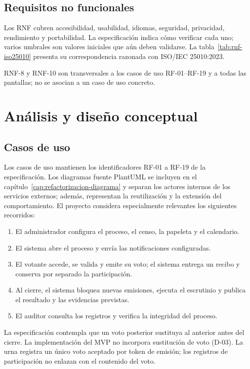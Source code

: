\section{Requisitos no funcionales}
\label{sec:requisitos-no-funcionales}

Los RNF cubren accesibilidad, usabilidad, idiomas, seguridad, privacidad,
rendimiento y portabilidad. La especificación indica cómo verificar cada uno;
varios umbrales son valores iniciales que aún deben validarse. La
tabla~\ref{tab:rnf-iso25010} presenta su correspondencia razonada con
ISO/IEC 25010:2023.

RNF-8 y RNF-10 son transversales a los casos de uso RF-01--RF-19 y a todas las
pantallas; no se asocian a un caso de uso concreto.

\chapter{Análisis y diseño conceptual}
\label{cap:analisis-diseno}

\section{Casos de uso}
\label{sec:casos-uso}

Los casos de uso mantienen los identificadores RF-01 a RF-19 de la
especificación. Los diagramas fuente PlantUML se incluyen en el
capítulo~\ref{cap:refactorizacion-diagrama} y separan los actores internos de
los servicios externos; además, representan la reutilización y la extensión
del comportamiento. El proyecto considera especialmente relevantes los siguientes
recorridos:

\begin{enumerate}
  \item El administrador configura el proceso, el censo, la papeleta y el
  calendario.
  \item El sistema abre el proceso y envía las notificaciones configuradas.
  \item El votante accede, se valida y emite su voto; el sistema entrega un
  recibo y conserva por separado la participación.
  \item Al cierre, el sistema bloquea nuevas emisiones, ejecuta el escrutinio
  y publica el resultado y las evidencias previstas.
  \item El auditor consulta los registros y verifica la integridad del
  proceso.
\end{enumerate}

La especificación contempla que un voto posterior sustituya al anterior antes
del cierre. La implementación del MVP no incorpora sustitución de voto (D-03). La urna
registra un único voto aceptado por token de emisión; los registros de
participación no enlazan con el contenido del voto.

